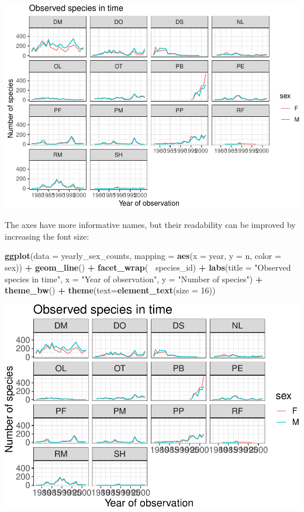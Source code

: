 \documentclass[]{book}
\newenvironment{Shaded}{\begin{snugshade}}{\end{snugshade}}
\newcommand{\KeywordTok}[1]{\textcolor[rgb]{0.13,0.29,0.53}{\textbf{#1}}}
\newcommand{\DataTypeTok}[1]{\textcolor[rgb]{0.13,0.29,0.53}{#1}}
\newcommand{\DecValTok}[1]{\textcolor[rgb]{0.00,0.00,0.81}{#1}}
\newcommand{\StringTok}[1]{\textcolor[rgb]{0.31,0.60,0.02}{#1}}
\newcommand{\OperatorTok}[1]{\textcolor[rgb]{0.81,0.36,0.00}{\textbf{#1}}}
\newcommand{\NormalTok}[1]{#1}
\begin{document}
\includegraphics{img/R-ecology-number-species-year-with-right-labels-1.pdf}

The axes have more informative names, but their readability can be
improved by increasing the font size:

\begin{Shaded}
\begin{Highlighting}[]
\KeywordTok{ggplot}\NormalTok{(}\DataTypeTok{data =}\NormalTok{ yearly_sex_counts, }\DataTypeTok{mapping =} \KeywordTok{aes}\NormalTok{(}\DataTypeTok{x =}\NormalTok{ year, }\DataTypeTok{y =}\NormalTok{ n, }\DataTypeTok{color =}\NormalTok{ sex)) }\OperatorTok{+}
\StringTok{    }\KeywordTok{geom_line}\NormalTok{() }\OperatorTok{+}
\StringTok{    }\KeywordTok{facet_wrap}\NormalTok{(}\OperatorTok{~}\StringTok{ }\NormalTok{species_id) }\OperatorTok{+}
\StringTok{    }\KeywordTok{labs}\NormalTok{(}\DataTypeTok{title =} \StringTok{"Observed species in time"}\NormalTok{,}
        \DataTypeTok{x =} \StringTok{"Year of observation"}\NormalTok{,}
        \DataTypeTok{y =} \StringTok{"Number of species"}\NormalTok{) }\OperatorTok{+}
\StringTok{    }\KeywordTok{theme_bw}\NormalTok{() }\OperatorTok{+}
\StringTok{    }\KeywordTok{theme}\NormalTok{(}\DataTypeTok{text=}\KeywordTok{element_text}\NormalTok{(}\DataTypeTok{size =} \DecValTok{16}\NormalTok{))}
\end{Highlighting}
\end{Shaded}

\includegraphics{img/R-ecology-number-species-year-with-right-labels-xfont-size-1.pdf}
\end{document}
